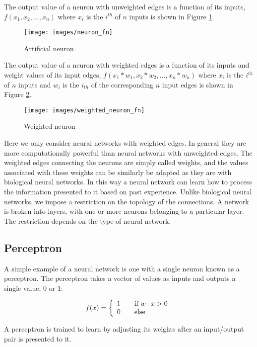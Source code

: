 The output value of a neuron with unweighted edges is a function of
its inputs, $f(x_1, x_2, ..., x_n)$ where $x_i$ is the $i^{th}$ of $n$
inputs is shown in Figure \ref{neuron}.

\begin{figure}[h!]
  \centering
  \texttt{[image: images/neuron\_fn]}
  \caption{Artificial neuron}
  \label{neuron}
\end{figure}

The output value of a neuron with weighted edges is a function of its
inputs and weight values of its input edges, $f(x_1 * w_1, x_2 * w_2,
..., x_n * w_n)$ where $x_i$ is the $i^{th}$ of $n$ inputs and $w_i$
is the $i_{th}$ of the corresponding $n$ input edges  is shown in
Figure \ref{weighted_neuron}.

\begin{figure}[h!]
  \centering
  \texttt{[image: images/weighted\_neuron\_fn]}
  \caption{Weighted neuron}
  \label{weighted_neuron}
\end{figure}

Here we only consider neural networks with weighted edges. 
In general they are more computationally powerful than neural networks with unweighted edges.
The weighted edges connecting the neurons are simply called weights, and the values associated with these weights can be similarly be adapted as they are with biological neural networks. 
In this way a neural network can learn how to process the information presented to it based on past experience. 
Unlike biological neural networks, we impose a restriction on the topology of the connections.
A network is broken into layers, with one or more neurons belonging to a particular layer.
The restriction depends on the type of neural network.

\subsection{Perceptron}
A simple example of a neural network is one with a single neuron known as a perceptron.
The perceptron takes a vector of values as inputs and outputs a single value, $0$ or $1$:

\[
  f(x) = \left\{ 
  \begin{array}{l l}
    1 & \quad \text{if $w \cdot x > 0$}\\
    0 & \quad \text{else}\\
  \end{array} \right.
\]

A perceptron is trained to learn by adjusting its weights after an
input/output pair is presented to it.

